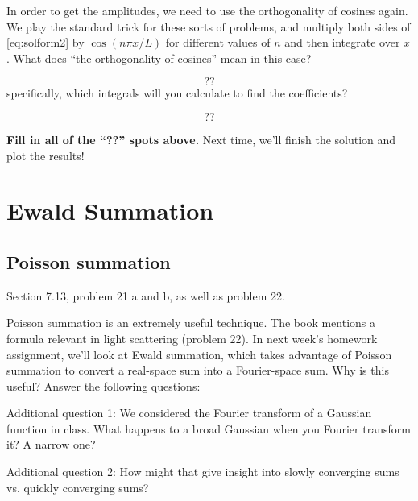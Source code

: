 \documentclass[12pt]{article}
\begin{document}
In order to get the amplitudes, we need to use the orthogonality of
cosines again. We play the standard trick for these sorts of problems,
and multiply both sides of \eqref{eq:solform2} by $\cos(n\pi x/L)$ for
different values of $n$ and then integrate over $x$. What does ``the
orthogonality of cosines'' mean in this case?


\begin{equation}
  ??
\end{equation}
specifically, which integrals will you calculate to find the
coefficients?

\begin{equation}
  ??
\end{equation}

{\bf Fill in all of the ``??'' spots above.} Next time, we'll finish
the solution and plot the results!

\section{Ewald Summation}
\subsection{Poisson summation}
Section 7.13, problem 21 a and b, as well as problem 22. 

Poisson summation is an extremely useful technique. The book mentions a formula relevant in light scattering (problem 22). In next week's homework assignment, we'll look at Ewald summation, which takes advantage of Poisson summation to convert a real-space sum into a Fourier-space sum. Why is this useful? Answer the following questions:

Additional question 1: We considered the Fourier transform of a Gaussian function in class. What happens to a broad Gaussian when you Fourier transform it? A narrow one?

Additional question 2: How might that give insight into slowly converging sums vs. quickly converging sums?
\end{document}
